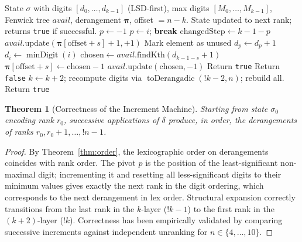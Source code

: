 \documentclass[11pt,a4paper]{article}
\newtheorem{theorem}{Theorem}[section]
\newcommand{\subfact}[1]{!{#1}} %
\newcommand{\mind}[1]{\operatorname{minDigit}(#1)}
\begin{document}
    \begin{algorithm}[h]
\caption{Derangadic Increment ($\delta$)}
\label{alg:increment}
\begin{algorithmic}[1]
    \Require State $\sigma$ with digits $[d_0,\dots,d_{k-1}]$ (LSD-first),
    max digits $[M_0,\dots,M_{k-1}]$, Fenwick tree $\textit{avail}$,
    derangement $\boldsymbol{\pi}$, offset $= n-k$.
    \Ensure State updated to next rank; returns \texttt{true} if successful.
    \State $p \leftarrow -1$
     
        \State $p \leftarrow i$; \textbf{break}
    \EndIf
    \EndFor
     
    \State $\text{changedStep} \leftarrow k-1-p$
        \State $\textit{avail}.\text{update}(\boldsymbol{\pi}[\text{offset}+s]+1, +1)$
        \State Mark element as unused
    \EndFor
    \State $d_p \leftarrow d_p + 1$
        \State $d_i \leftarrow \mind{i}$
    \EndFor
        \State $\text{chosen} \leftarrow \textit{avail}.\text{findKth}(d_{k-1-s}+1)$
        \State $\boldsymbol{\pi}[\text{offset}+s] \leftarrow \text{chosen}-1$
        \State $\textit{avail}.\text{update}(\text{chosen}, -1)$
    \EndFor
    \State Return \texttt{true}
    \Else {}
     Return \texttt{false} \EndIf
    \State $k \leftarrow k+2$;
    \State recompute digits via $\operatorname{toDerangadic}(\subfact{k-2}, n)$;
    \State rebuild all.
    \State Return \texttt{true}
    \EndIf
\end{algorithmic}
    \end{algorithm}

    \begin{theorem}[Correctness of the Increment Machine]
        \label{thm:correctness}
        Starting from state $\sigma_0$ encoding rank $r_0$, successive applications
        of $\delta$ produce, in order, the derangements of ranks
        $r_0, r_0+1, \dots, \subfact{n}-1$.
    \end{theorem}

    \begin{proof}
        By Theorem~\ref{thm:order}, the lexicographic order on derangements
        coincides with rank order. The pivot $p$ is the position of the
        least-significant non-maximal digit; incrementing it and resetting all
        less-significant digits to their minimum values gives exactly the next
        rank in the digit ordering, which corresponds to the next derangement in
        lex order. Structural expansion correctly transitions from the last rank
        in the $k$-layer ($\subfact{k}-1$) to the first rank in the $(k+2)$-layer
        ($\subfact{k}$). Correctness has been empirically validated by comparing
        successive increments against independent unranking for $n \in \{4,\dots,10\}$.
    \end{proof}
\end{document}
